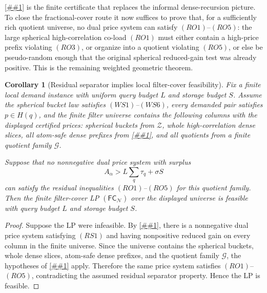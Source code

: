 \documentclass[10pt]{article}
\newcommand{\cref}[1]{\ref{##1}}
\newcommand{\Cref}[1]{\ref{##1}}
\newtheorem{corollary}[theorem]{Corollary}
\theoremstyle{definition}
\begin{document}
\Cref{cor:residual-dense-cover-obstruction} is the finite certificate that
replaces the informal dense-recursion picture.  To close the fractional-cover
route it now suffices to prove that, for a sufficiently rich quotient universe,
no dual price system can satisfy \((RO1)\)--\((RO5)\): the large spherical
high-correlation co-load \((RO1)\) must either contain a high-price prefix
violating \((RO3)\), or organize into a quotient violating \((RO5)\), or else be
pseudo-random enough that the original spherical reduced-gain test was already
positive.  This is the remaining weighted geometric theorem.

\begin{corollary}[Residual separator implies local filter-cover feasibility]
   \label{cor:residual-separator-local-cover}
   Fix a finite local demand instance with uniform query budget \(L\) and storage
   budget \(S\).  Assume the spherical bucket law satisfies \((WS1)\)--\((WS6)\),
   every demanded pair satisfies \(p\in H(q)\), and the finite filter universe
   contains the following columns with the displayed certified prices:
   spherical buckets from \(\mathcal Z\), whole high-correlation dense slices,
   all atom-safe dense prefixes from
   \cref{lem:dense-slice-prefix-separation}, and all quotients from a finite
   quotient family \(\mathcal G\).

   Suppose that no nonnegative dual price system with surplus
   \[
      A_\alpha>L\sum_q\tau_q+\sigma S
      \tag{RS1}
   \]
   can satisfy the residual inequalities \((RO1)\)--\((RO5)\) for this quotient
   family.  Then the finite filter-cover LP
   \((\mathsf{FC}_{\mathcal N})\) over the displayed universe is feasible with
   query budget \(L\) and storage budget \(S\).
\end{corollary}

\begin{proof}
   Suppose the LP were infeasible.  By \cref{lem:finite-filter-cover-dual}, there
   is a nonnegative dual price system satisfying \((RS1)\) and having
   nonpositive reduced gain on every column in the finite universe.  Since the
   universe contains the spherical buckets, whole dense slices, atom-safe dense
   prefixes, and the quotient family \(\mathcal G\), the hypotheses of
   \cref{cor:residual-dense-cover-obstruction} apply.  Therefore the same price
   system satisfies \((RO1)\)--\((RO5)\), contradicting the assumed residual
   separator property.  Hence the LP is feasible.
\end{proof}
\end{document}
